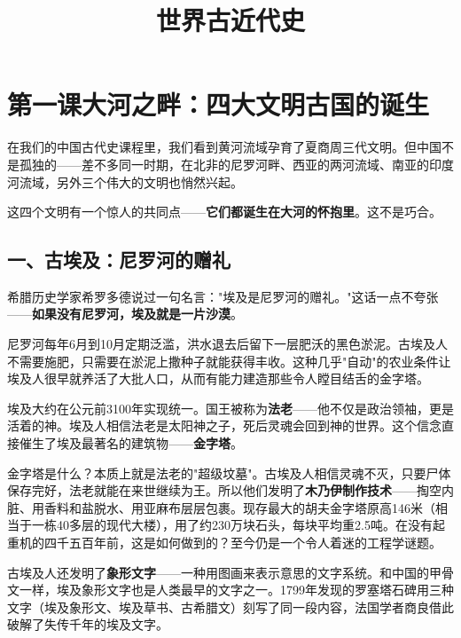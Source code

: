 \documentclass[a4paper,12pt]{ctexart}
\title{\textcolor{blue!70!black}{\Huge\textbf{世界古近代史}}}
\author{}
\date{}
\begin{document}
\maketitle
\thispagestyle{empty}

\tableofcontents
\newpage

\section{\textcolor{orange!80!black}{第一课\quad 大河之畔：四大文明古国的诞生}}

在我们的中国古代史课程里，我们看到黄河流域孕育了夏商周三代文明。但中国不是孤独的——差不多同一时期，在北非的尼罗河畔、西亚的两河流域、南亚的印度河流域，另外三个伟大的文明也悄然兴起。

这四个文明有一个惊人的共同点——\textbf{它们都诞生在大河的怀抱里}。这不是巧合。

\subsection*{一、古埃及：尼罗河的赠礼}

希腊历史学家希罗多德说过一句名言："埃及是尼罗河的赠礼。"这话一点不夸张——\textbf{如果没有尼罗河，埃及就是一片沙漠}。

尼罗河每年6月到10月定期泛滥，洪水退去后留下一层肥沃的黑色淤泥。古埃及人不需要施肥，只需要在淤泥上撒种子就能获得丰收。这种几乎"自动"的农业条件让埃及人很早就养活了大批人口，从而有能力建造那些令人瞠目结舌的金字塔。

埃及大约在公元前3100年实现统一。国王被称为\textbf{法老}——他不仅是政治领袖，更是活着的神。埃及人相信法老是太阳神之子，死后灵魂会回到神的世界。这个信念直接催生了埃及最著名的建筑物——\textbf{金字塔}。

金字塔是什么？本质上就是法老的"超级坟墓"。古埃及人相信灵魂不灭，只要尸体保存完好，法老就能在来世继续为王。所以他们发明了\textbf{木乃伊制作技术}——掏空内脏、用香料和盐脱水、用亚麻布层层包裹。现存最大的胡夫金字塔原高146米（相当于一栋40多层的现代大楼），用了约230万块石头，每块平均重2.5吨。在没有起重机的四千五百年前，这是如何做到的？至今仍是一个令人着迷的工程学谜题。

古埃及人还发明了\textbf{象形文字}——一种用图画来表示意思的文字系统。和中国的甲骨文一样，埃及象形文字也是人类最早的文字之一。1799年发现的罗塞塔石碑用三种文字（埃及象形文、埃及草书、古希腊文）刻写了同一段内容，法国学者商良借此破解了失传千年的埃及文字。
\end{document}
